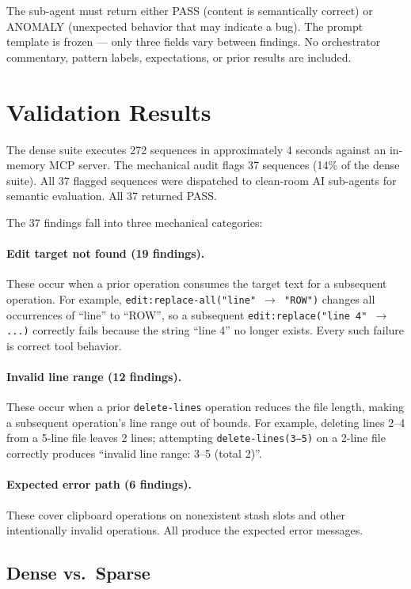 \documentclass{article}
\begin{document}
The sub-agent must return either PASS (content is semantically correct) or
ANOMALY (unexpected behavior that may indicate a bug). The prompt template is
frozen --- only three fields vary between findings. No orchestrator commentary,
pattern labels, expectations, or prior results are included.

\section{Validation Results}
\label{sec:results}

The dense suite executes 272 sequences in approximately 4 seconds against an
in-memory MCP server. The mechanical audit flags 37 sequences (14\% of the
dense suite). All 37 flagged sequences were dispatched to clean-room AI
sub-agents for semantic evaluation. All 37 returned PASS.

The 37 findings fall into three mechanical categories:

\paragraph{Edit target not found (19 findings).} These occur when a prior
operation consumes the target text for a subsequent operation. For example,
\texttt{edit:replace-all("line" $\rightarrow$ "ROW")} changes all occurrences
of ``line'' to ``ROW'', so a subsequent \texttt{edit:replace("line 4"
$\rightarrow$ ...)} correctly fails because the string ``line 4'' no longer
exists. Every such failure is correct tool behavior.

\paragraph{Invalid line range (12 findings).} These occur when a prior
\texttt{delete-lines} operation reduces the file length, making a subsequent
operation's line range out of bounds. For example, deleting lines 2--4 from a
5-line file leaves 2 lines; attempting \texttt{delete-lines(3--5)} on a 2-line
file correctly produces ``invalid line range: 3--5 (total 2)''.

\paragraph{Expected error path (6 findings).} These cover clipboard operations
on nonexistent stash slots and other intentionally invalid operations. All
produce the expected error messages.

\subsection{Dense vs.\ Sparse}
\label{sec:dense-vs-sparse}
\end{document}
